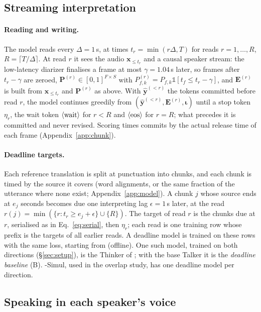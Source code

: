 \subsection{Streaming interpretation}
\label{sec:method-simul}

\paragraph{Reading and writing.} The model reads every $\Delta=1$\,s, at times $t_r=\min(r\Delta,T)$ for reads
$r=1,\dots,R$, $R=\lceil T/\Delta\rceil$. At read $r$ it sees the audio $\bm{x}_{\le t_r}$ and a causal speaker stream:
the low-latency diarizer finalises a frame at most $\gamma=1.04$\,s later, so frames after $t_r-\gamma$ are zeroed,
$\bm{P}^{(r)}\in[0,1]^{F\times S}$ with $P^{(r)}_{f,k}=P_{f,k}\mathds{1}[t_f\le t_r-\gamma]$, and $\bm{E}^{(r)}$ is built
from $\bm{x}_{\le t_r}$ and $\bm{P}^{(r)}$ as above. With $\hat{\bm{y}}^{(<r)}$ the tokens committed before read $r$, the
model continues greedily from $(\hat{\bm{y}}^{(<r)},\bm{E}^{(r)},\bm{\iota})$ until a stop token $\eta_r$, the wait
token $\langle\mathrm{wait}\rangle$ for $r<R$ and $\langle\mathrm{eos}\rangle$ for $r=R$; what precedes it is committed and never revised. Scoring times commits by
the actual release time of each frame (Appendix~\ref{app:chunk}).

\paragraph{Deadline targets.} Each reference translation is split at punctuation into chunks, and each chunk is timed by
the source it covers (word alignments, or the same fraction of the utterance where none exist; Appendix~\ref{app:model}).
A chunk $j$ whose source ends at $e_j$ seconds becomes due one interpreting lag $\epsilon=1$\,s later, at the read
$r(j)=\min(\{r: t_r\ge e_j+\epsilon\}\cup\{R\})$. The target of read $r$ is the chunks due at $r$, serialised as in
Eq.~\eqref{eq:serial}, then $\eta_r$; each read is one training row whose prefix is the targets of all earlier reads. A
deadline model is trained on these rows with the same loss, starting from \sys{} (offline). One such model, trained on
both directions (\S\ref{sec:setup}), is the Thinker of \sys{}; with the base Talker it is the \emph{deadline baseline}
(B). \sys{}-Simul, used in the overlap study, has one deadline model per direction.

\subsection{Speaking in each speaker's voice}
\label{sec:method-voice}

